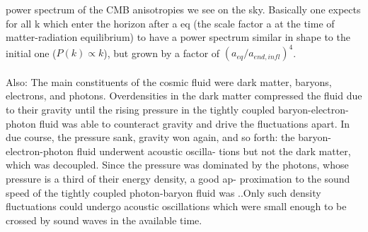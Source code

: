 \begin{description}
power spectrum of the CMB anisotropies we see on the sky. Basically one expects for
all k which enter the horizon after a eq (the scale factor a at the time of matter-radiation
equilibrium) to have a power spectrum similar in shape to the initial one ($P(k) \propto k$),
but grown by a factor of $(a_{eq} /a_{end, infl} )^4$.\\
\\
Also: The main constituents of the cosmic fluid were dark
matter, baryons, electrons, and photons. Overdensities
in the dark matter compressed the fluid due to their
gravity until the rising pressure in the tightly coupled
baryon-electron-photon fluid was able to counteract
gravity and drive the fluctuations apart. In due course,
the pressure sank, gravity won again, and so forth: the
baryon-electron-photon fluid underwent acoustic oscilla-
tions but not the dark matter, which was decoupled.
Since the pressure was dominated by the photons, whose
pressure is a third of their energy density, a good ap-
proximation to the sound speed of the tightly coupled
photon-baryon fluid was ..Only such density fluctuations could undergo acoustic
oscillations which were small enough to be crossed by
sound waves in the available time.\\
\\


\end{description}
